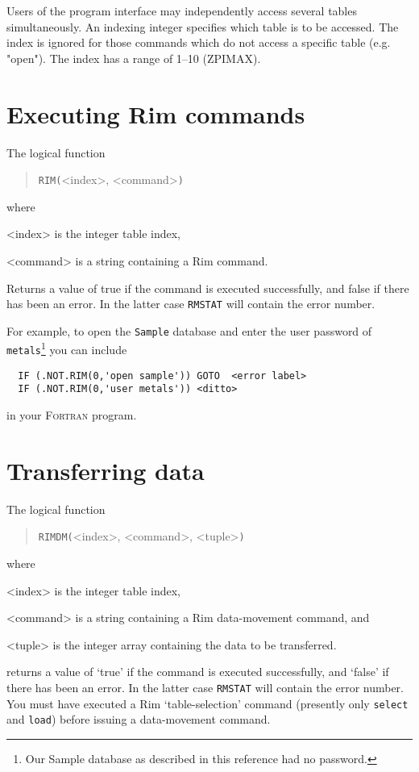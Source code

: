 \documentclass[11pt,a4paper]{report}
\def\I{\index}
\begin{document}
Users of the program interface may independently access several
tables simultaneously.  An indexing integer specifies which
table is to be accessed.
The index is ignored for
those commands which do not access
a specific table (e.g. "open").
The index has a range of 1--10 (ZPIMAX).
 
 
\section{Executing Rim commands}
%
\I{rim@"RIM"}
The logical function
\begin{verse}
    \verb!RIM(!<index>, <command>\verb!)!
\end{verse}

where
\begin{List}
  \item[<index>] is the integer table index,
  \item[<command>] is a string containing a Rim command.
\end{List}

Returns a value of true if the command is executed successfully,
and false if there has been an error.  In the latter case
\verb!RMSTAT!  will contain the error number.
 
For example, to open the \verb!Sample! database and enter the
user password of \verb!metals!\footnote{Our Sample database
as described in this reference had no password.}
you can include
 
\begin{verbatim}
  IF (.NOT.RIM(0,'open sample')) GOTO  <error label>
  IF (.NOT.RIM(0,'user metals')) <ditto>
\end{verbatim}
 
in your \textsc{Fortran} program.
 
\section{Transferring data}
%
\I{rimdm@"RIMDM"}
The logical function
\begin{verse}
  \verb!RIMDM(!<index>, <command>, <tuple>\verb!)!
\end{verse}
where
\begin{List}
  \item[<index>] is the integer table index,
  \item[<command>] is a string containing a Rim data-movement command, and
  \item[ <tuple>] is the integer array containing the data to be transferred.
\end{List}
returns a value of `true' if the command is executed successfully,
and `false' if there has been an error.  In the latter case
\verb!RMSTAT!  will contain the error number.
You must have executed a Rim `table-selection' command
(presently only \verb!select! and \verb!load!)
before issuing a data-movement command.
 
\end{document}
